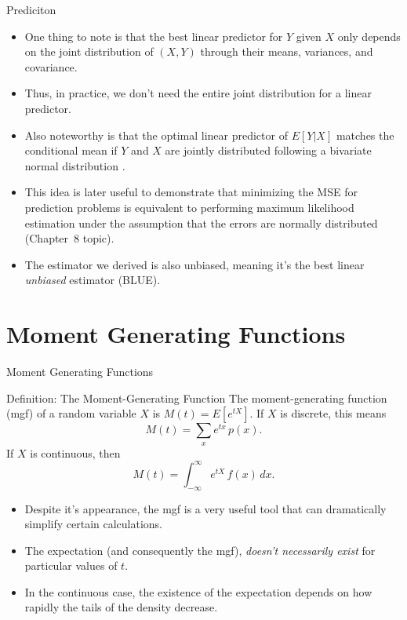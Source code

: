 \begin{frame}[allowframebreaks]{Prediciton}
\begin{itemize}
    \framebreak
    
    \item One thing to note is that the best linear predictor for $Y$ given $X$ only depends on the joint distribution of $(X, Y)$ through their means, variances, and covariance.
    \item Thus, in practice, we don't need the entire joint distribution for a linear predictor.
    \item Also noteworthy is that the optimal linear predictor of $E[Y|X]$ matches the conditional mean if $Y$ and $X$ are jointly distributed following a bivariate normal distribution \citep[See Example 4.1.1 B,][]{rice07}.
    \item This idea is later useful to demonstrate that minimizing the MSE for prediction problems is equivalent to performing maximum likelihood estimation under the assumption that the errors are normally distributed (Chapter~8 topic).
    \item The estimator we derived is also \alert{unbiased}, meaning it's the best linear \emph{unbiased} estimator (BLUE).
  \end{itemize}
  
\end{frame}

\section{Moment Generating Functions}

\begin{frame}[allowframebreaks]{Moment Generating Functions}

  \begin{block}{Definition: The Moment-Generating Function}
    The \alert{moment-generating function} (mgf) of a random variable $X$ is $M(t) = E[e^{tX}]$.
    If $X$ is discrete, this means
    $$
    M(t) = \sum_x e^{tx}\, p(x).
    $$
    If $X$ is continuous, then
    $$
    M(t) = \int_{-\infty}^\infty e^{tX}\, f(x)\, dx.
    $$
  \end{block}
  
  \begin{itemize}
    \item Despite it's appearance, the mgf is a very useful tool that can dramatically simplify certain calculations.
    \item The expectation (and consequently the mgf), \emph{doesn't necessarily exist} for particular values of $t$.
    \item In the continuous case, the existence of the expectation depends on how rapidly the tails of the density decrease.
  \end{itemize}
\end{frame}

